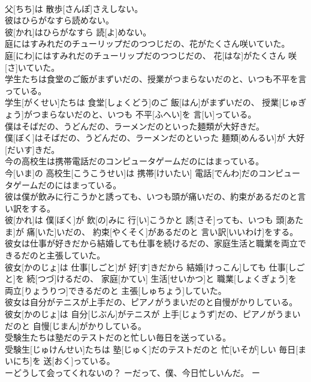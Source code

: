 \documentclass[8pt]{extreport}
\begin{document}
\begin{CJK}{UTF8}{min}
\\	父[ちち]は 散歩[さんぽ]さえしない。
\\	彼はひらがなすら読めない。	
\\	彼[かれ]はひらがなすら 読[よ]めない。
\\	庭にはすみれだのチューリップだのつつじだの、花がたくさん咲いていた。	
\\	庭[にわ]にはすみれだのチューリップだのつつじだの、 花[はな]がたくさん 咲[さ]いていた。
\\	学生たちは食堂のご飯がまずいだの、授業がつまらないだのと、いつも不平を言っている。	
\\	学生[がくせい]たちは 食堂[しょくどう]のご 飯[はん]がまずいだの、 授業[じゅぎょう]がつまらないだのと、いつも 不平[ふへい]を 言[い]っている。
\\	僕はそばだの、うどんだの、ラーメンだのといった麺類が大好きだ。	
\\	僕[ぼく]はそばだの、うどんだの、ラーメンだのといった 麺類[めんるい]が 大好[だいす]きだ。
\\	今の高校生は携帯電話だのコンピュータゲームだのにはまっている。	
\\	今[いま]の 高校生[こうこうせい]は 携帯[けいたい] 電話[でんわ]だのコンピュータゲームだのにはまっている。
\\	彼は僕が飲みに行こうかと誘っても、いつも頭が痛いだの、約束があるだのと言い訳をする。	
\\	彼[かれ]は 僕[ぼく]が 飲[の]みに 行[い]こうかと 誘[さそ]っても、いつも 頭[あたま]が 痛[いた]いだの、 約束[やくそく]があるだのと 言い訳[いいわけ]をする。
\\	彼女は仕事が好きだから結婚しても仕事を続けるだの、家庭生活と職業を両立できるだのと主張していた。	
\\	彼女[かのじょ]は 仕事[しごと]が 好[す]きだから 結婚[けっこん]しても 仕事[しごと]を 続[つづ]けるだの、 家庭[かてい] 生活[せいかつ]と 職業[しょくぎょう]を 両立[りょうりつ]できるだのと 主張[しゅちょう]していた。
\\	彼女は自分がテニスが上手だの、ピアノがうまいだのと自慢がかりしている。	
\\	彼女[かのじょ]は 自分[じぶん]がテニスが 上手[じょうず]だの、ピアノがうまいだのと 自慢[じまん]がかりしている。
\\	受験生たちは塾だのテストだのと忙しい毎日を送っている。	
\\	受験生[じゅけんせい]たちは 塾[じゅく]だのテストだのと 忙[いそが]しい 毎日[まいにち]を 送[おく]っている。
\\	ーどうして会ってくれないの？ ーだって、僕、今日忙しいんだ。	ー

\end{CJK}
\end{document}
